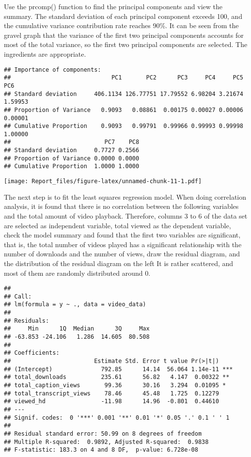 \documentclass[
]{article}
\begin{document}
Use the prcomp() function to find the principal components and view the
summary. The standard deviation of each principal component exceeds 100,
and the cumulative variance contribution rate reaches 90\%. It can be
seen from the gravel graph that the variance of the first two principal
components accounts for most of the total variance, so the first two
principal components are selected. The ingredients are appropriate.

\begin{verbatim}
## Importance of components:
##                             PC1       PC2      PC3     PC4     PC5     PC6
## Standard deviation     406.1134 126.77751 17.79552 6.98204 3.21674 1.59953
## Proportion of Variance   0.9093   0.08861  0.00175 0.00027 0.00006 0.00001
## Cumulative Proportion    0.9093   0.99791  0.99966 0.99993 0.99998 1.00000
##                           PC7    PC8
## Standard deviation     0.7727 0.2566
## Proportion of Variance 0.0000 0.0000
## Cumulative Proportion  1.0000 1.0000
\end{verbatim}

\texttt{[image: Report\_files/figure-latex/unnamed-chunk-11-1.pdf]}

The next step is to fit the least squares regression model. When doing
correlation analysis, it is found that there is no correlation between
the following variables and the total amount of video playback.
Therefore, columns 3 to 6 of the data set are selected as independent
variable, total viewed as the dependent variable, check the model
summary and found that the first two variables are significant, that is,
the total number of videos played has a significant relationship with
the number of downloads and the number of views, draw the residual
diagram, and the distribution of the residual diagram on the left It is
rather scattered, and most of them are randomly distributed around 0.

\begin{verbatim}
## 
## Call:
## lm(formula = y ~ ., data = video_data)
## 
## Residuals:
##     Min      1Q  Median      3Q     Max 
## -63.853 -24.106   1.286  14.605  80.508 
## 
## Coefficients:
##                        Estimate Std. Error t value Pr(>|t|)    
## (Intercept)              792.85      14.14  56.064 1.14e-11 ***
## total_downloads          235.61      56.82   4.147  0.00322 ** 
## total_caption_views       99.36      30.16   3.294  0.01095 *  
## total_transcript_views    78.46      45.48   1.725  0.12279    
## viewed_hd                -11.98      14.96  -0.801  0.44610    
## ---
## Signif. codes:  0 '***' 0.001 '**' 0.01 '*' 0.05 '.' 0.1 ' ' 1
## 
## Residual standard error: 50.99 on 8 degrees of freedom
## Multiple R-squared:  0.9892, Adjusted R-squared:  0.9838 
## F-statistic: 183.3 on 4 and 8 DF,  p-value: 6.728e-08
\end{verbatim}
\end{document}
